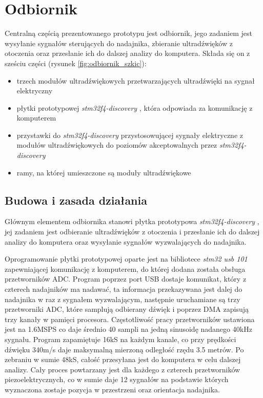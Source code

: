 \chapter{Odbiornik}


Centralną częścią prezentowanego prototypu jest odbiornik,
jego zadaniem jest wysyłanie sygnałów sterujących do nadajnika, zbieranie ultradźwięków z otoczenia oraz przesłanie
ich do dalszej analizy do komputera.
Składa się on z sześciu części (rysunek \ref{fig:odbiornik_szkic}):

\begin{itemize}
 \item trzech modułów ultradźwiękowych przetwarzających ultradźwięki na sygnał elektryczny
 \item płytki prototypowej \textit{stm32f4-discovery} \cite{bib:stm32f4Discovery}, która odpowiada za komunikację z komputerem
 \item przystawki do \textit{stm32f4-discovery} przystosowującej sygnały elektryczne z modułów ultradźwiękowych
  do poziomów akceptowalnych przez \textit{stm32f4-discovery}
 \item ramy, na której umieszczone są moduły ultradźwiękowe
\end{itemize}




\section{Budowa i zasada działania}

Głównym elementem odbiornika stanowi płytka prototypowa \textit{stm32f4-discovery} \cite{bib:stm32f4Discovery},
jej zadaniem jest odbieranie ultradźwięków z otoczenia i przesłanie ich do dalszej analizy do komputera oraz wysyłanie sygnałów wyzwalających
do nadajnika.

Oprogramowanie płytki prototypowej oparte jest na bibliotece \textit{stm32 usb 101} \cite{bib:stm32_usb_101}
zapewniającej komunikację z komputerem, do której dodana została obsługa przetworników ADC.
Program poprzez port USB dostaje komunikat, który z czterech nadajników ma nadawać, ta informacja przekazywana jest
dalej do nadajnika w raz z sygnałem wyzwalającym, następnie uruchamiane są trzy przetworniki ADC, które 
samplują odbierany dźwięk i poprzez DMA zapisują trzy kanały w pamięci procesora.
Częstotliwość pracy przetworników ustawiona jest na 1.6MSPS co daje średnio 40 sampli na jedną sinusoidę nadanego 40kHz sygnału.
Program zapamiętuje 16kS na każdym kanale, co przy prędkości dźwięku 340m/s daje maksymalną mierzoną odległość rzędu 3.5 metrów.
Po zebraniu w sumie 48kS, całość przesyłana jest do komputera w celu dalszej analizy.
Cały proces powtarzany jest dla każdego z czterech przetworników piezoelektrycznych, 
co w sumie daje 12 sygnałów na podstawie których wyznaczona zostaje 
pozycja w przestrzeni oraz orientacja nadajnika.

